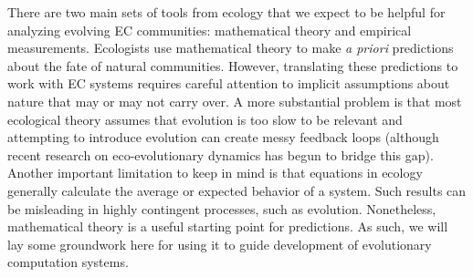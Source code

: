There are two main sets of tools from ecology that we expect to be helpful for analyzing evolving EC communities: mathematical theory and empirical measurements.
Ecologists use mathematical theory to make \textit{a priori} predictions about the fate of natural communities.  However, translating these predictions to work with EC systems requires careful attention to implicit assumptions about nature that may or may not carry over.
A more substantial problem is that most ecological theory assumes that
evolution is too slow
to be relevant and attempting to introduce evolution can create messy feedback loops (although recent research on eco-evolutionary dynamics has begun to bridge this gap).
Another important limitation to keep in mind is that equations in ecology generally calculate the average or expected behavior of a system. Such results can be misleading in highly contingent processes, such as evolution.
Nonetheless, mathematical theory is a useful starting point for predictions. As such, we will lay some groundwork here for using it to guide development of evolutionary computation systems.

